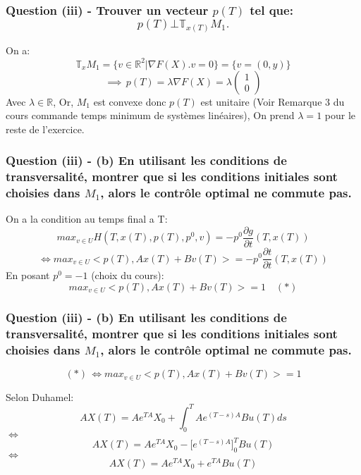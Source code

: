 \documentclass[xcolor=dvipsnames]{beamer}
\newcommand{\R}{\mathbb{R}}
\begin{document}
\begin{frame}
\frametitle{Question (iii) -  Trouver un vecteur $p(T)$ tel que: $$p(T) \bot \mathbb T_{x(T)} M_1. $$}

On a:
$$\mathbb T_xM_1 = \lbrace v ∈ \R^2| ∇F(X).v = 0 \rbrace = \lbrace v= (0,y)\rbrace$$
 $$\implies \, p(T) = \lambda ∇F(X) = \lambda \left(\begin{matrix} 
        1\\ 
        0
      \end{matrix} \right) $$
Avec $\lambda \in \R$, Or, $M_1$ est convexe donc $p(T)$ est unitaire (Voir Remarque 3 du cours commande temps minimum de systèmes linéaires), On prend $\lambda = 1$ pour le reste de l'exercice.

\end {frame}

\begin{frame}
\frametitle{Question (iii) -   (b) En utilisant les conditions de transversalité, montrer que si les conditions initiales sont choisies dans $M_1$, alors le contrôle optimal ne commute pas.}
On a la condition au temps final a T:\\
$$max_{v∈U} H(T,x(T),p(T),p^0,v) = −p^0 \frac {∂g}{∂t}(T,x(T))$$
$$\iff max_{v∈U} <p(T),Ax(T)+Bv(T)> = -p^0  \frac {∂t}{∂t}(T,x(T)) $$
En posant $p^0 = -1$ (choix du cours):\\
$$ max_{v∈U} <p(T),Ax(T)+Bv(T)> = 1 \quad (*)$$

\end {frame}

\begin{frame}
\frametitle{Question (iii) -  (b) En utilisant les conditions de transversalité, montrer que si les conditions initiales sont choisies dans $M_1$, alors le contrôle optimal ne commute pas.}

 $$(*) \, \iff  max_{v∈U} <p(T),Ax(T)+Bv(T)> = 1$$
 
Selon Duhamel:\\
$$AX(T) = Ae^{TA}X_0 + \int_0^T Ae^{(T-s)A}Bu(T)ds$$
$\iff $ $$AX(T) = Ae^{TA}X_0 - \big[e^{(T-s)A}\big]_0^TBu(T)$$
$\iff $ $$ AX(T) = Ae^{TA}X_0 + e^{TA}Bu(T)$$


\end {frame}
\end{document}
